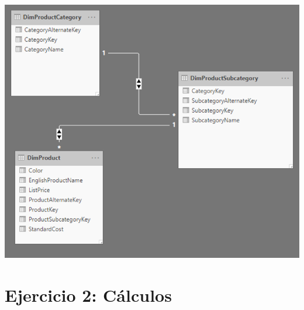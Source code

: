 \documentclass[12pt,letterpaper]{article}
\begin{document}
\begin{center}
\includegraphics[width=15cm]{images/10}\newline
\end{center}

\section{Ejercicio 2: Cálculos} 
\end{document}
